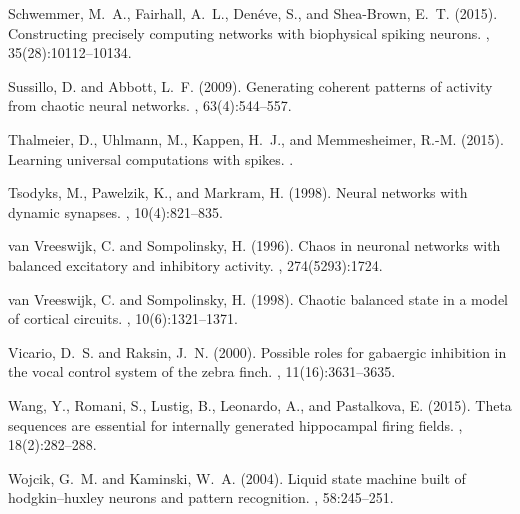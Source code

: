 \documentclass[11pt]{article} %
\begin{document}
\begin{thebibliography}{10}
Schwemmer, M.~A., Fairhall, A.~L., Den{\'e}ve, S., and Shea-Brown, E.~T.
  (2015).
\newblock Constructing precisely computing networks with biophysical spiking
  neurons.
, 35(28):10112--10134.

Sussillo, D. and Abbott, L.~F. (2009).
\newblock Generating coherent patterns of activity from chaotic neural
  networks.
, 63(4):544--557.

Thalmeier, D., Uhlmann, M., Kappen, H.~J., and Memmesheimer, R.-M. (2015).
\newblock Learning universal computations with spikes.
.

Tsodyks, M., Pawelzik, K., and Markram, H. (1998).
\newblock Neural networks with dynamic synapses.
, 10(4):821--835.

van Vreeswijk, C. and Sompolinsky, H. (1996).
\newblock Chaos in neuronal networks with balanced excitatory and inhibitory
  activity.
, 274(5293):1724.

van Vreeswijk, C. and Sompolinsky, H. (1998).
\newblock Chaotic balanced state in a model of cortical circuits.
, 10(6):1321--1371.

Vicario, D.~S. and Raksin, J.~N. (2000).
\newblock Possible roles for gabaergic inhibition in the vocal control system
  of the zebra finch.
, 11(16):3631--3635.

Wang, Y., Romani, S., Lustig, B., Leonardo, A., and Pastalkova, E. (2015).
\newblock Theta sequences are essential for internally generated hippocampal
  firing fields.
, 18(2):282--288.

Wojcik, G.~M. and Kaminski, W.~A. (2004).
\newblock Liquid state machine built of hodgkin--huxley neurons and pattern
  recognition.
, 58:245--251.


\end{thebibliography}
\end{document}
